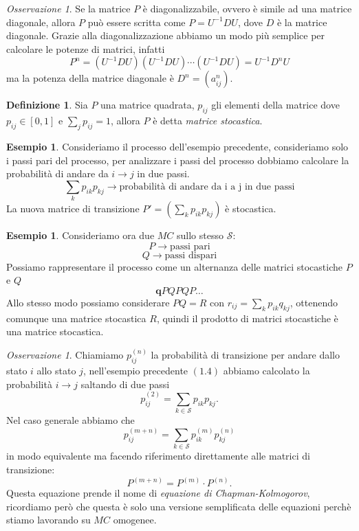 \documentclass{article}
\theoremstyle{definition}
\newtheorem{definition}[theorem]{Definizione}
\newtheorem{example}[theorem]{Esempio}
\theoremstyle{remark}
\newtheorem{remark}[theorem]{Osservazione}
\begin{document}
\begin{remark}
    Se la matrice $P$ è diagonalizzabile, ovvero è simile ad una matrice diagonale, allora $P$ può essere
    scritta come $P=U^{-1}DU$, dove $D$ è la matrice diagonale. Grazie alla diagonalizzazione abbiamo un modo
    più semplice per calcolare le potenze di matrici, infatti
    $$P^n = (U^{-1}DU)(U^{-1}DU)\dotsb (U^{-1}DU) = U^{-1}D^nU$$
    ma la potenza della matrice diagonale è $D^n = (a_{ij}^n)$.
\end{remark}
\begin{definition}
    Sia $P$ una matrice quadrata, $p_{ij}$ gli elementi della matrice dove $p_{ij}\in[0,1]$ e $\sum_j p_{ij} = 1$,
    allora $P$ è detta \textit{matrice stocastica}.
\end{definition}
\begin{example}
    Consideriamo il processo dell'esempio precedente, consideriamo solo i passi pari del processo, per analizzare i passi del processo dobbiamo calcolare
    la probabilità di andare da $i\to j$ in due passi.
    $$\sum_k p_{ik}p_{kj}\rightarrow\text{probabilità di andare da i a j in due passi}$$
    La nuova matrice di transizione $P' = (\sum_k p_{ik}p_{kj})$  è stocastica.
\end{example}
\begin{example}
    Consideriamo ora due $MC$ sullo stesso $\mathcal{S}$:
    $$ P\to \text{passi pari}$$
    $$ Q\to \text{passi dispari}$$
    Possiamo rappresentare il processo come un alternanza delle matrici stocastiche $P$ e $Q$
    $$\boldsymbol{q}PQPQP\dots$$
    Allo stesso modo possiamo considerare  $PQ=R$ con $r_{ij} = \sum_k p_{ik}q_{kj}$, ottenendo comunque una matrice stocastica $R$,
    quindi il prodotto di matrici stocastiche è una matrice stocastica.
\end{example}
\begin{remark}
    Chiamiamo $p^{(n)}_{ij}$ la probabilità di transizione per andare dallo stato $i$ allo stato $j$,
    nell'esempio precedente $\mathbf{(1.4)}$ abbiamo calcolato la probabilità $i\to j$ saltando di due passi
    $$ p^{(2)}_{ij} = \sum_{k\in\mathcal{S}} p_{ik}p_{kj}.$$
    Nel caso generale abbiamo che
    $$p^{(m+n)}_{ij} = \sum_{k\in\mathcal{S}} p^{(m)}_{ik} p^{(n)}_{kj}$$
    in modo equivalente ma facendo riferimento direttamente alle matrici di transizione:
    $$P^{(m+n)} = P^{(m)}\cdot P^{(n)}.$$
    Questa equazione prende il nome di \textit{equazione di Chapman-Kolmogorov}, ricordiamo però che questa è solo una
    versione semplificata delle equazioni perchè stiamo lavorando su $MC$ omogenee.
\end{remark}
\end{document}
